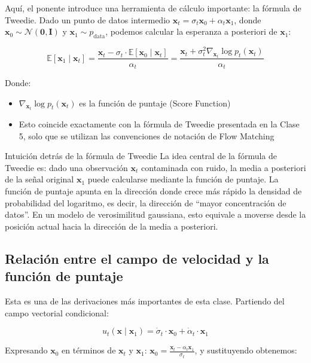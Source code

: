 Aquí, el ponente introduce una herramienta de cálculo importante: la fórmula de Tweedie. Dado un punto de datos intermedio $\mathbf{x}_t = \sigma_t \mathbf{x}_0 + \alpha_t \mathbf{x}_1$, donde $\mathbf{x}_0 \sim \mathcal{N}(\mathbf{0}, \mathbf{I})$ y $\mathbf{x}_1 \sim p_{\text{data}}$, podemos calcular la esperanza a posteriori de $\mathbf{x}_1$:

$$\mathbb{E}[\mathbf{x}_1 \mid \mathbf{x}_t] = \frac{\mathbf{x}_t - \sigma_t \cdot \mathbb{E}[\mathbf{x}_0 \mid \mathbf{x}_t]}{\alpha_t} = \frac{\mathbf{x}_t + \sigma_t^2 \nabla_{\mathbf{x}_t} \log p_t(\mathbf{x}_t)}{\alpha_t}$$

Donde:
\begin{itemize}
    \item $\nabla_{\mathbf{x}_t} \log p_t(\mathbf{x}_t)$ es la función de puntaje (Score Function)
    \item Esto coincide exactamente con la fórmula de Tweedie presentada en la Clase 5, solo que se utilizan las convenciones de notación de Flow Matching
\end{itemize}

\begin{knowledgebox}{Intuición detrás de la fórmula de Tweedie}
La idea central de la fórmula de Tweedie es: dado una observación $\mathbf{x}_t$ contaminada con ruido, la media a posteriori de la señal original $\mathbf{x}_1$ puede calcularse mediante la función de puntaje. La función de puntaje apunta en la dirección donde crece más rápido la densidad de probabilidad del logaritmo, es decir, la dirección de ``mayor concentración de datos''. En un modelo de verosimilitud gaussiana, esto equivale a moverse desde la posición actual hacia la dirección de la media a posteriori.
\end{knowledgebox}

\subsection{Relación entre el campo de velocidad y la función de puntaje}

Esta es una de las derivaciones más importantes de esta clase. Partiendo del campo vectorial condicional:

$$u_t(\mathbf{x} \mid \mathbf{x}_1) = \dot{\sigma}_t \cdot \mathbf{x}_0 + \dot{\alpha}_t \cdot \mathbf{x}_1$$

Expresando $\mathbf{x}_0$ en términos de $\mathbf{x}_t$ y $\mathbf{x}_1$: $\mathbf{x}_0 = \frac{\mathbf{x}_t - \alpha_t \mathbf{x}_1}{\sigma_t}$, y sustituyendo obtenemos:

